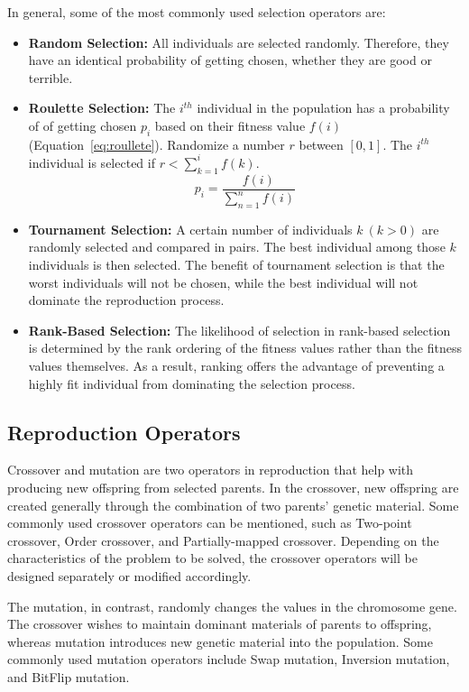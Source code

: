 In general, some of the most commonly used selection operators are:
\begin{itemize}
	\item \textbf{Random Selection:} All individuals are selected randomly. Therefore, they have an identical probability of getting chosen, whether they are good or terrible.
	\item \textbf{Roulette Selection:} The $i^{th}$ individual in the population has a probability of of getting chosen $p_i$ based on their fitness value $f(i)$ (Equation~\ref{eq:roullete}). Randomize a number $r$ between $[0,1]$. The $i^{th}$ individual is selected if $r < \sum^i_{k=1} f(k)$.
	\begin{equation}
		\label{eq:roullete}
		p_i = \frac{f(i)}{\sum^n_{n=1} f(i)}
	\end{equation}
	\item \textbf{Tournament Selection:} A certain number of individuals $k~(k > 0)$ are randomly selected and compared in pairs. The best individual among those $k$ individuals is then selected. The benefit of tournament selection is that the worst individuals will not be chosen, while the best individual will not dominate the reproduction process. 
	\item \textbf{Rank-Based Selection:} The likelihood of selection in rank-based selection is determined by the rank ordering of the fitness values rather than the fitness values themselves. As a result, ranking offers the advantage of preventing a highly fit individual from dominating the selection process.
\end{itemize}


\subsection {Reproduction Operators}
\label{ga:reproduction}
Crossover and mutation are two operators in reproduction that help with producing new offspring from selected parents. In the crossover, new offspring are created generally through the combination of two parents' genetic material. Some commonly used crossover operators can be mentioned, such as Two-point crossover, Order crossover, and Partially-mapped crossover. Depending on the characteristics of the problem to be solved, the crossover operators will be designed separately or modified accordingly.

The mutation, in contrast, randomly changes  the values in the chromosome gene. The crossover wishes to maintain dominant materials of parents to offspring, whereas mutation introduces new genetic material into the population. Some commonly used mutation operators include Swap mutation, Inversion mutation, and BitFlip mutation.


